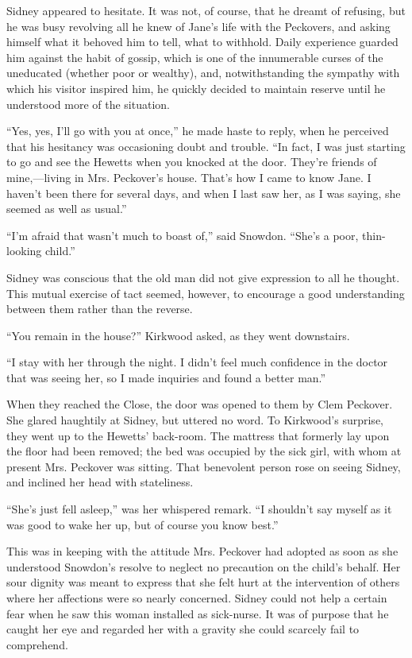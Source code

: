 Sidney appeared to hesitate. It was not, of course, that he dreamt of
refusing, but he was busy revolving all he knew of Jane's life with the
Peckovers, and asking himself {\protect\hypertarget{147}{}{}}what it
behoved him to tell, what to withhold. Daily experience guarded him
against the habit of gossip, which is one of the innumerable curses of
the uneducated (whether poor or wealthy), and, notwithstanding the
sympathy with which his visitor inspired him, he quickly decided to
maintain reserve until he understood more of the situation.

``Yes, yes, I'll go with you at once,'' he made haste to reply, when he
perceived that his hesitancy was occasioning doubt and trouble. ``In
fact, I was just starting to go and see the Hewetts when you knocked at
the door. They're friends of mine,---living in Mrs. Peckover's house.
That's how I came to know Jane. I haven't been there for several days,
and when I last saw her, as I was saying, she seemed as well as usual.''

``I'm afraid that wasn't much to boast of,'' said Snowdon. ``She's a
poor, thin-looking child.''

Sidney was conscious that the old man did not give expression to all he
thought. This mutual exercise of tact seemed, however, to
{\protect\hypertarget{148}{}{}}encourage a good understanding between
them rather than the reverse.

``You remain in the house?'' Kirkwood asked, as they went downstairs.

``I stay with her through the night. I didn't feel much confidence in
the doctor that was seeing her, so I made inquiries and found a better
man.''

When they reached the Close, the door was opened to them by Clem
Peckover. She glared haughtily at Sidney, but uttered no word. To
Kirkwood's surprise, they went up to the Hewetts' back-room. The
mattress that formerly lay upon the floor had been removed; the bed was
occupied by the sick girl, with whom at present Mrs. Peckover was
sitting. That benevolent person rose on seeing Sidney, and inclined her
head with stateliness.

``She's just fell asleep,'' was her whispered remark. ``I shouldn't say
myself as it was good to wake her up, but of course you know best.''

This was in keeping with the attitude Mrs.
{\protect\hypertarget{149}{}{}}Peckover had adopted as soon as she
understood Snowdon's resolve to neglect no precaution on the child's
behalf. Her sour dignity was meant to express that she felt hurt at the
intervention of others where her affections were so nearly concerned.
Sidney could not help a certain fear when he saw this woman installed as
sick-nurse. It was of purpose that he caught her eye and regarded her
with a gravity she could scarcely fail to comprehend.


